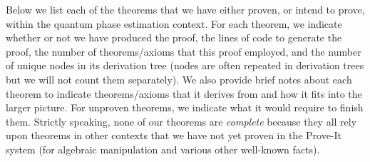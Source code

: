 \documentclass{article}[12pt]
\begin{document}
Below we list each of the theorems that we have either proven, or intend to prove, within the quantum phase estimation context.  For each theorem, we indicate whether or not we have produced the proof, the lines of code to generate the proof, the number of theorems/axioms that this proof employed, and the number of unique nodes in its derivation tree (nodes are often repeated in derivation trees but we will not count them separately).  We also provide brief notes about each theorem to indicate theorems/axioms that it derives from and how it fits into the larger picture.  For unproven theorems, we indicate what it would require to finish them.  Strictly speaking, none of our theorems are {\em complete} because they all rely upon theorems in other contexts that we have not yet proven in the Prove-It system (for algebraic manipulation and various other well-known facts).
\end{document}
